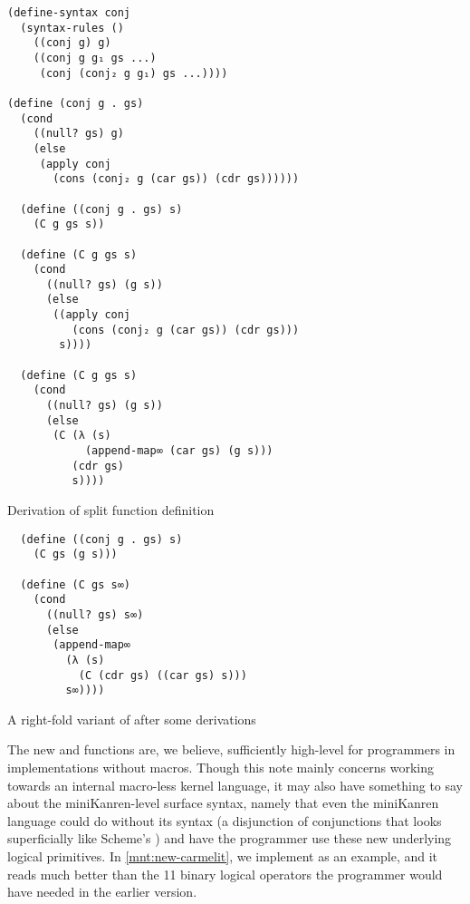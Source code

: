 \documentclass[sigplan,balance,pbalance,natbib=false]{acmart}
\begin{document}
\begin{listing}[h]
\begin{verbatim}
(define-syntax conj
  (syntax-rules ()
    ((conj g) g)
    ((conj g g₁ gs ...)
     (conj (conj₂ g g₁) gs ...))))

(define (conj g . gs)
  (cond
    ((null? gs) g)
    (else
     (apply conj
       (cons (conj₂ g (car gs)) (cdr gs))))))

  (define ((conj g . gs) s)
    (C g gs s))

  (define (C g gs s)
    (cond
      ((null? gs) (g s))
      (else
       ((apply conj
          (cons (conj₂ g (car gs)) (cdr gs)))
        s))))

  (define (C g gs s)
    (cond
      ((null? gs) (g s))
      (else
       (C (λ (s)
            (append-map∞ (car gs) (g s)))
          (cdr gs)
          s))))
\end{verbatim}
  \caption{Derivation of split  function definition}\label{mnt:conj-substituted-through}
\end{listing}

\begin{listing}[h]
\begin{verbatim}
  (define ((conj g . gs) s)
    (C gs (g s)))

  (define (C gs s∞)
    (cond
      ((null? gs) s∞)
      (else
       (append-map∞
         (λ (s)
           (C (cdr gs) ((car gs) s)))
         s∞))))
\end{verbatim}
  \caption{A right-fold variant of  after some derivations}\label{mnt:conj-right-fold-definition}
\end{listing}

The new  and  functions are, we
believe, sufficiently high-level for programmers in implementations
without macros. Though this note mainly concerns working towards an
internal macro-less kernel language, it may also have something to say
about the miniKanren-level surface syntax, namely that even the
miniKanren language could do without its  syntax (a
disjunction of conjunctions that looks superficially like
Scheme's ) and have the programmer use these new
underlying logical primitives. In \cref{mnt:new-carmelit}, we
implement  as an example, and it reads
much better than the 11 binary logical operators the programmer would
have needed in the earlier version.
\end{document}
